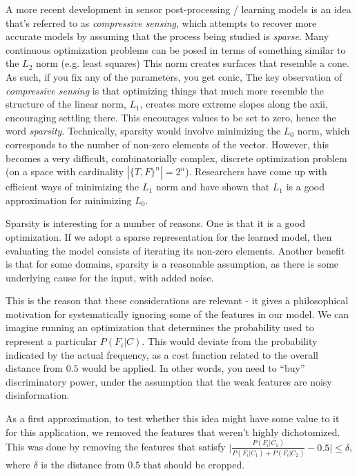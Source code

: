 \documentclass[12pt,a4paper]{article}
\begin{document}
A more recent development in sensor post-processing / learning models is an idea that's referred to as \emph{compressive sensing}, which attempts to recover more accurate models by assuming that the process being studied is \emph{sparse}.  Many continuous optimization problems can be posed in terms of something similar to the $ L_2 $ norm (e.g. least squares)  This norm creates surfaces that resemble a cone.  As such, if you fix any of the parameters, you get conic,   The key observation of \emph{compressive sensing} is that optimizing things that much more resemble the structure of the linear norm, $ L_1 $, creates more extreme slopes along the axii, encouraging settling there.  This encourages values to be set to zero, hence the word \emph{sparsity}.  Technically, sparsity would involve minimizing the $ L_0 $ norm, which corresponds to the number of non-zero elements of the vector.  However, this becomes a very difficult, combinatorially complex, discrete optimization problem (on a space with cardinality $ | \{T, F\}^n | =  2^n $).  Researchers have come up with efficient ways of minimizing the $ L_1 $ norm and have shown that $ L_1 $ is a good approximation for minimizing $ L_0 $.

Sparsity is interesting for a number of reasons.  One is that it is a good optimization.  If we adopt a sparse representation for the learned model, then evaluating the model consists of iterating its non-zero elements.  Another benefit is that for some domains, sparsity is a reasonable assumption, as there is some underlying cause for the input, with added noise.

This is the reason that these considerations are relevant - it gives a philosophical motivation for systematically ignoring some of the features in our model.  We can imagine running an optimization that determines the probability used to represent a particular $ P(F_i \vert C) $.  This would deviate from the probability indicated by the actual frequency, as a cost function related to the overall distance from $ 0.5 $ would be applied.  In other words, you need to ``buy'' discriminatory power, under the assumption that the weak features are noisy disinformation.

As a first approximation, to test whether this idea might have some value to it for this application, we removed the features that weren't highly dichotomized.  This was done by removing the features that satisfy $ \vert \frac{P(F_i \vert C_1)}{P(F_i \vert C_1) + P(F_i \vert C_2)} - 0.5 \vert \leq \delta $, where $ \delta $ is the distance from $ 0.5 $ that should be cropped.
\end{document}
